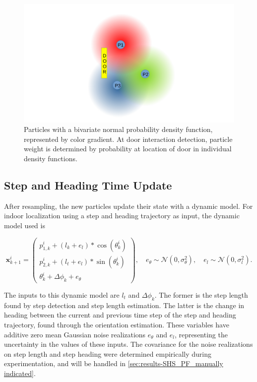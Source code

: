 	\begin{figure}[]
			\centering
			\includegraphics[trim=240 0 220 0, clip, width=0.35\linewidth]{images/pf_diagram}
					\setlength{\belowcaptionskip}{-10pt}
			\caption{ Particles with a bivariate normal probability density function, represented by color gradient. At door interaction detection, particle weight is determined by probability at location of door in individual density functions.}
			\label{fig:pfdiagram}
	\end{figure}
	
	
\subsection{Step and Heading Time Update}
\label{sec:meth-pf-SHS_time_update}
	After resampling, the new particles update their state with a dynamic model. For indoor localization using a step and heading trajectory as input, the dynamic model used is
	
	\begin{equation}
		\label{eq:SHS_dynamic_model_with_noise}
		\mathbf{x}^i_{k + 1}
		=
		\left(\begin{array}{l}
			p_{1,k}^i + (l_{k} + e_l) * \cos (\theta_{k}^i) \\
			p_{2,k}^i + (l_{t} + e_l) * \sin (\theta_{k}^i) \\
			\theta_{k}^i + \Delta \phi_k + e_\theta 
		\end{array}\right), \quad
		e_{\theta} \sim \mathcal{N}\left(0, \sigma_{\theta}^{2}\right), \quad e_{l} \sim \mathcal{N}\left(0, \sigma_{l}^{2}\right).
	\end{equation}

The inputs to this dynamic model are $l_{t}$ and $\Delta \phi_k$. The former is the step length found by step detection and step length estimation. The latter is the change in heading between the current and previous time step of the step and heading trajectory, found through the orientation estimation. These variables have additive zero mean Gaussian noise realizations $e_{\theta}$ and $e_{l}$, representing the uncertainty in the values of these inputs. The covariance for the noise realizations on step length and step heading were determined empirically during experimentation, and will be handled in \cref{sec:results-SHS_PF_manually indicated}.\par 

